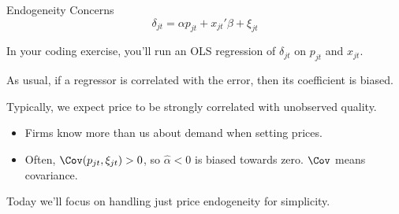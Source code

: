 \documentclass[aspectratio=169,t,11pt,table]{beamer}
\begin{document}
\begin{frame}{Endogeneity Concerns}
    \vspace{-\baselineskip}
    \begin{equation*}
        \delta_{jt} = \alpha p_{jt} + x_{jt}'\beta + \xi_{jt}
    \end{equation*}
    \vspace{-0.5\baselineskip}
    \begin{wideitemize}
        \item In your coding exercise, you'll run an OLS regression of $\delta_{jt}$ on $p_{jt}$ and $x_{jt}$.
        \pause
        \item As usual, if a regressor is correlated with the error, then its coefficient is biased.
        \pause
        \item Typically, we expect price to be strongly correlated with unobserved quality.
        \begin{itemize}
            \item Firms know more than us about demand when setting prices.
            \item Often, $\Cov(p_{jt}, \xi_{jt}) > 0$, so $\hat{\alpha} < 0$ is biased towards zero. $\Cov$ means covariance.
        \end{itemize}
        \pause
        \item Today we'll focus on handling just price endogeneity for simplicity.
    \end{wideitemize}
\end{frame}
\end{document}
